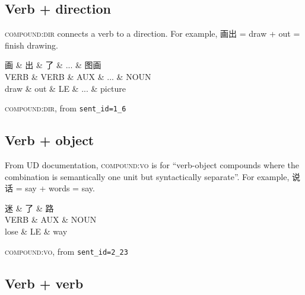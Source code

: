 \documentclass[UTF8,oneside]{book}
\begin{document}
\subsection{Verb + direction}

\textsc{compound:dir} connects a verb to a direction. For example, 画出 = draw + out = finish drawing. 

\begin{tree}[h]
\centering
\begin{dependency}[theme=simple]
\begin{deptext}[column sep=.5cm, row sep=.5ex]
画 \& 出 \& 了 \& ... \& 图画 \\
VERB \& VERB \& AUX \& ... \& NOUN \\
draw \& out \& LE \& ... \& picture \\
\end{deptext}
\end{dependency}
\caption{\textsc{compound:dir}, from \texttt{sent\_id=1\_6}}
\end{tree}

\subsection{Verb + object}

From UD documentation, \textsc{compound:vo} is for ``verb-object compounds where the combination is semantically one unit but syntactically separate''. For example, 说话 = say + words = say.

\begin{tree}[h]
\centering
\begin{dependency}[theme=simple]
\begin{deptext}[column sep=.5cm, row sep=.5ex]
迷 \& 了 \& 路 \\
VERB \& AUX \& NOUN\\
lose \& LE \& way \\
\end{deptext}
\end{dependency}
\caption{\textsc{compound:vo}, from \texttt{sent\_id=2\_23}}
\label{tree:compound:vo}
\end{tree}

\subsection{Verb + verb}
\end{document}
